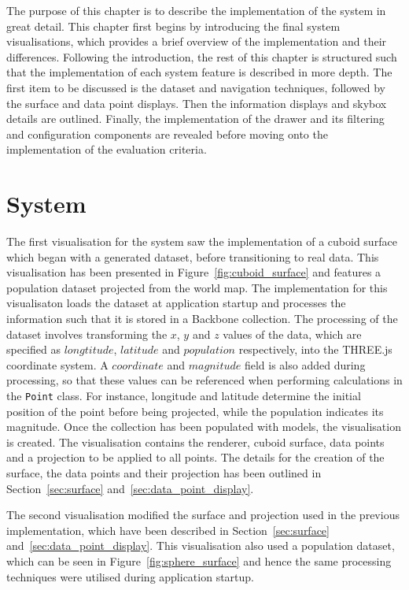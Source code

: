 
The purpose of this chapter is to describe the implementation of the system in great detail. This chapter first begins by introducing the final system visualisations, which provides a brief overview of the implementation and their differences. Following the introduction, the rest of this chapter is structured such that the implementation of each system feature is described in more depth. The first item to be discussed is the dataset and navigation techniques, followed by the surface and data point displays. Then the information displays and skybox details are outlined. Finally, the implementation of the drawer and its filtering and configuration components are revealed before moving onto the implementation of the evaluation criteria.

\section{System} {
\label{sec:system}

	The first visualisation for the system saw the implementation of a cuboid surface which began with a generated dataset, before transitioning to real data. This visualisation has been presented in Figure~\ref{fig:cuboid_surface} and features a population dataset projected from the world map. The implementation for this visualisaton loads the dataset at application startup and processes the information such that it is stored in a Backbone collection. The processing of the dataset involves transforming the $x$, $y$ and $z$ values of the data, which are specified as $longtitude$, $latitude$ and $population$ respectively, into the THREE.js coordinate system. A $coordinate$ and $magnitude$ field is also added during processing, so that these values can be referenced when performing calculations in the \texttt{Point} class. For instance, longitude and latitude determine the initial position of the point before being projected, while the population indicates its magnitude. Once the collection has been populated with models, the visualisation is created. The visualisation contains the renderer, cuboid surface, data points and a projection to be applied to all points. The details for the creation of the surface, the data points and their projection has been outlined in Section~\ref{sec:surface} and~\ref{sec:data_point_display}.

	

	The second visualisation modified the surface and projection used in the previous implementation, which have been described in Section~\ref{sec:surface} and~\ref{sec:data_point_display}. This visualisation also used a population dataset, which can be seen in Figure~\ref{fig:sphere_surface} and hence the same processing techniques were utilised during application startup.

}

